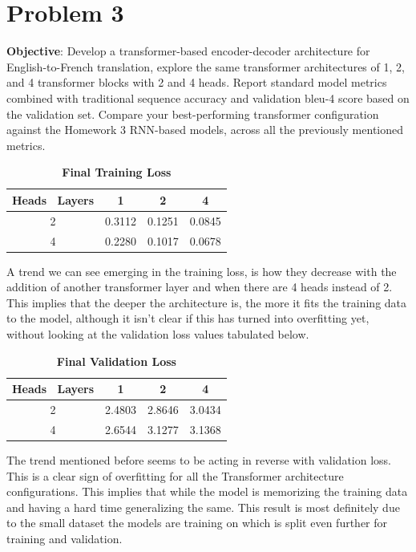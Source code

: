 \documentclass[a4paper]{article}
\begin{document}
\section*{\textbf{Problem 3}}
\textbf{Objective}: Develop a transformer-based encoder-decoder architecture for English-to-French translation, explore the same transformer architectures of 1, 2, and 4 transformer blocks with 2 and 4 heads. Report standard model metrics combined with traditional sequence accuracy and validation bleu-4 score based on the validation set. Compare your best-performing transformer configuration against the Homework 3 RNN-based models, across all the previously mentioned metrics.

\begin{table}[H]
    \centering
    \caption{\textbf{Final Training Loss}}
    \label{tab:finalTLp3}
    \begin{tabular}{| c || c | c | c |}
        \hline
        Heads \ Layers & 1 & 2 & 4 \\
        \hline
        2 & 0.3112 & 0.1251 & 0.0845 \\
        \hline
        4 & 0.2280 & 0.1017 & 0.0678 \\
        \hline
    \end{tabular}
\end{table}

A trend we can see emerging in the training loss, is how they decrease with the addition of another transformer layer and when there are 4 heads instead of 2. This implies that the deeper the architecture is, the more it fits the training data to the model, although it isn't clear if this has turned into overfitting yet, without looking at the validation loss values tabulated below.

\begin{table}[H]
    \centering
    \caption{\textbf{Final Validation Loss}}
    \label{tab:finalVLp3}
    \begin{tabular}{| c || c | c | c |}
        \hline
        Heads \ Layers & 1 & 2 & 4 \\
        \hline
        2 & 2.4803 & 2.8646 & 3.0434 \\
        \hline
        4 & 2.6544 & 3.1277 & 3.1368 \\
        \hline
    \end{tabular}
\end{table}

The trend mentioned before seems to be acting in reverse with validation loss. This is a clear sign of overfitting for all the Transformer architecture configurations. This implies that while the model is memorizing the training data and having a hard time generalizing the same. This result is most definitely due to the small dataset the models are training on which is split even further for training and validation.
\end{document}
